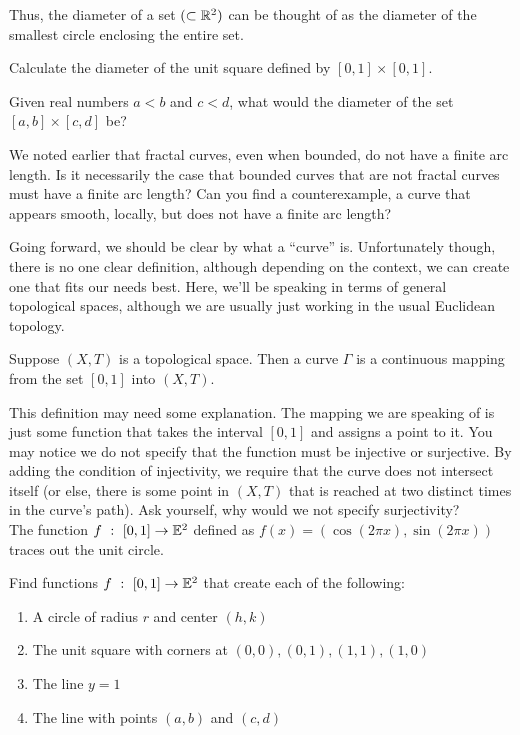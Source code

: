 Thus, the diameter of a set $(\subset \mathbb{R}^2)$ can be thought of as the diameter of the smallest circle enclosing the entire set. 
\begin{exercise}
    Calculate the diameter of the unit square defined by $[0,1]\times[0,1]$.
\end{exercise}
\begin{exercise}
    Given real numbers $a<b$ and $c<d$, what would the diameter of the set $[a,b]\times [c,d]$ be?
\end{exercise}
\begin{exercise} 
    We noted earlier that fractal curves, even when bounded, do not have a finite arc length. Is it necessarily the case that bounded curves that are not fractal curves must have a finite arc length? Can you find a counterexample, a curve that appears smooth, locally, but does not have a finite arc length? 
\end{exercise}

Going forward, we should be clear by what a ``curve'' is. Unfortunately though, there is no one clear definition, although depending on the context, we can create one that fits our needs best. Here, we'll be speaking in terms of general topological spaces, although we are usually just working in the usual Euclidean topology. \\

\begin{definition}[Curve]
    Suppose $(X,T)$ is a topological space. Then a curve $\Gamma$ is a continuous mapping from the set $[0,1]$ into $(X,T)$.
\end{definition}

This definition may need some explanation. The mapping we are speaking of is just some function that takes the interval $[0,1]$ and assigns a point to it. You may notice we do not specify that the function must be injective or surjective. By adding the condition of injectivity, we require that the curve does not intersect itself (or else, there is some point in $(X,T)$ that is reached at two distinct times in the curve's path). Ask yourself, why would we not specify surjectivity?\\

The function $f\ :\ [0,1]\to\mathbb{E}^2$ defined as $f(x)=\left(\cos(2\pi x),\sin(2\pi x)\right)$ traces out the unit circle.\\

\begin{exercise}
    Find functions $f\ :\ [0,1]\to\mathbb{E}^2$ that create each of the following:
    \begin{enumerate}
        \item A circle of radius $r$ and center $(h,k)$
        \item The unit square with corners at $(0,0),(0,1),(1,1),(1,0)$
        \item The line $y=1$
        \item The line with points $(a,b)$ and $(c,d)$
    \end{enumerate}
\end{exercise}

